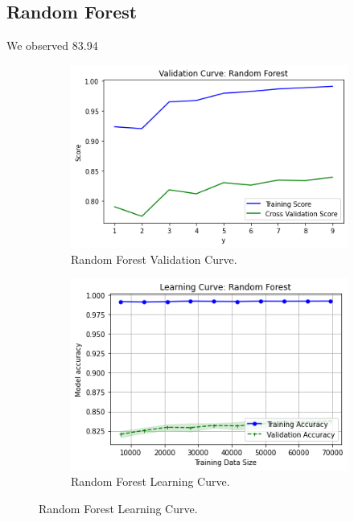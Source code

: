 \subsection{Random Forest}
We observed 83.94 %
\begin{figure}[h]
\centering
\begin{subfigure}[b]{0.45\linewidth}
    \includegraphics[width=\linewidth]{rfvc}
    \caption{Random Forest Validation Curve.}
\end{subfigure}
\begin{subfigure}[b]{0.45\linewidth}
    \includegraphics[width=\linewidth]{rflc}
    \caption{Random Forest Learning Curve.}
\end{subfigure}
\end{figure}

